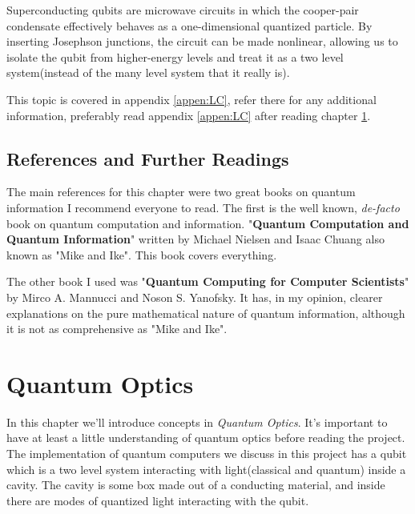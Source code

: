 \documentclass[english, a4paper, 12pt, twoside]{article}
\numberwithin{equation}{section} %
\begin{document}
Superconducting qubits are microwave circuits in which the cooper-pair condensate effectively behaves as a one-dimensional quantized particle. By inserting Josephson junctions, the circuit can be made nonlinear, allowing us to isolate the qubit from higher-energy levels and treat it as a two  level system(instead of the many level system that it really is).

This topic is covered in appendix \ref{appen:LC}, refer there for any additional information, preferably read appendix \ref{appen:LC} after reading chapter \ref{chap:quantum-optics}.

\subsection{References and Further Readings}
The main references for this chapter were two great books on quantum information I recommend everyone to read. The first is the well known, \textit{de-facto} book on quantum computation and information. "\textbf{Quantum Computation and Quantum Information}" written by Michael Nielsen and Isaac Chuang also known as "Mike and Ike". This book covers everything.

The other book I used was "\textbf{Quantum Computing for Computer Scientists}" by Mirco A. Mannucci and Noson S. Yanofsky. It has, in my opinion, clearer explanations on the pure mathematical nature of quantum information, although it is not as comprehensive as "Mike and Ike".

\newpage
\section{Quantum Optics} \label{chap:quantum-optics}
In this chapter we'll introduce concepts in \textit{Quantum Optics}. It's important to have at least a little understanding of quantum optics before reading the project. The implementation of quantum computers we discuss in this project has a qubit which is a two level system interacting with light(classical and quantum) inside a cavity. The cavity is some box made out of a conducting material, and inside there are modes of quantized light interacting with the qubit.
\end{document}
